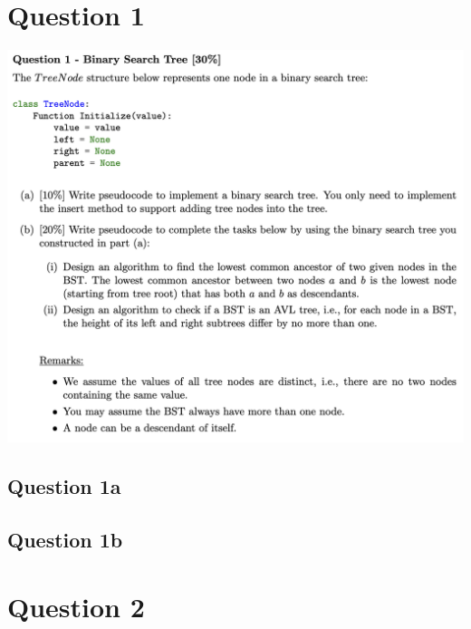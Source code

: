 \documentclass{article}
\begin{document}

\section*{Question 1}

\begin{center}
    \includegraphics[width=\linewidth]{img/1.png}
\end{center}

\subsection*{Question 1a}


\subsection*{Question 1b}


\section*{Question 2}
\end{document}
